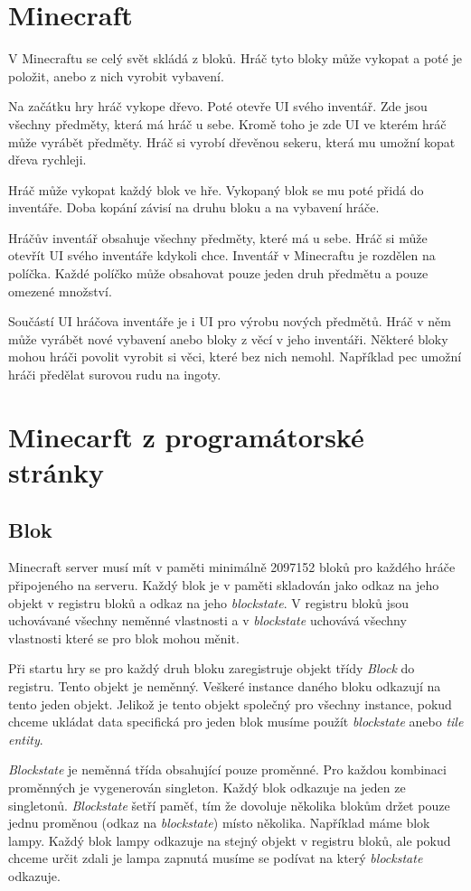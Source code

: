 \documentclass[FM,RP]{tulthesis}
\begin{document}

\chapter{Minecraft}
V Minecraftu se celý svět skládá z bloků. Hráč tyto bloky může vykopat a poté je položit, anebo z nich vyrobit vybavení.
\par
Na začátku hry hráč vykope dřevo. Poté otevře UI svého inventář. Zde jsou všechny předměty, která má hráč u sebe. Kromě toho je zde UI ve kterém hráč může vyrábět předměty. Hráč si vyrobí dřevěnou sekeru, která mu umožní kopat dřeva rychleji.
\par
Hráč může vykopat každý blok ve hře. Vykopaný blok se mu poté přidá do inventáře. Doba kopání závisí na druhu bloku a na vybavení hráče.
\par
Hráčův inventář obsahuje všechny předměty, které má u sebe. Hráč si může otevřít UI svého inventáře kdykoli chce. Inventář v Minecraftu je rozdělen na políčka. Každé políčko může obsahovat pouze jeden druh předmětu a pouze omezené množství.
\par
Součástí UI hráčova inventáře je i UI pro výrobu nových předmětů. Hráč v něm může vyrábět nové vybavení anebo bloky z věcí v jeho inventáři. Některé bloky mohou hráči povolit vyrobit si věci, které bez nich nemohl. Například pec umožní hráči předělat surovou rudu na ingoty.  

\chapter{Minecarft z programátorské stránky}
\section{Blok}
Minecraft server musí mít v paměti minimálně 2097152 bloků pro každého hráče připojeného na serveru. Každý blok je v paměti skladován jako odkaz na jeho objekt v registru bloků a odkaz na jeho \textit{blockstate}. V registru bloků jsou uchovávané všechny neměnné vlastnosti a v \textit{blockstate} uchovává všechny vlastnosti které se pro blok mohou měnit. 
\par Při startu hry se pro každý druh bloku zaregistruje objekt třídy \textit{Block} do registru. Tento objekt je neměnný. Veškeré instance daného bloku odkazují na tento jeden objekt. Jelikož je tento objekt společný pro všechny instance, pokud chceme ukládat data specifická pro jeden blok musíme použít \textit{blockstate} anebo\textit{ tile entity}.
\par \textit{Blockstate} je neměnná třída obsahující pouze proměnné. Pro každou kombinaci proměnných je vygenerován singleton. Každý blok odkazuje na jeden ze singletonů. \textit{Blockstate} šetří paměť, tím že dovoluje několika blokům držet pouze jednu proměnou (odkaz na \textit{blockstate}) místo několika. Například máme blok lampy. Každý blok lampy odkazuje na stejný objekt v registru bloků, ale pokud chceme určit zdali je lampa zapnutá musíme se podívat na který \textit{blockstate} odkazuje.
\end{document}
